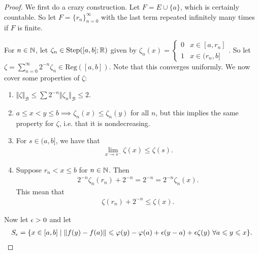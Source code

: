 \documentclass{report}
\begin{document}
\begin{proof}
    We first do a crazy construction. Let $F = E \cup \{a\}$, which is certainly countable. So let $F = \{r_n\}_{n=0}^\infty$ with the last term repeated infinitely many times if $F$ is finite.

    For $n \in \NN$, let $\zeta_n \in\mathrm{Step}([a,b]; \RR)$ given by $\zeta_n(x) = \begin{cases}
        0 & x \in [a, r_n] \\
        1 & x \in (r_n, b]
    \end{cases}$. So let $\zeta = \sum_{n=0}^\infty 2^{-n} \zeta_n \in \mathrm{Reg}([a,b])$.  Note that this converges uniformly. We now cover some properties of $\zeta$:
    \begin{enumerate}
        \item $\Vert \zeta \Vert_{\mathcal B} \leq \sum 2^{-n} \Vert \zeta_n\Vert_{\mathcal B} \leq 2$.
        \item $a \leq x < y \leq b \implies \zeta_n(x) \leq \zeta_n(y)$ for all $n$, but this implies the same property for $\zeta$, i.e. that it is nondecreasing.
        \item For $s \in (a, b]$, we have that 
        \begin{align*}
            \lim_{x \to s^-} \zeta(x) \leq \zeta(s).
        \end{align*}
        \item Suppose $r_n < x \leq b$ for $n \in \NN$. Then 
        \begin{align*}
            2^{-n}\zeta_n(r_n) + 2^{-n} = 2^{-n} = 2^{-n} \zeta_n(x).
        \end{align*}
        This mean that 
        \begin{align*}
            \zeta(r_n) + 2^{-n} \leq \zeta(x).
        \end{align*}
    \end{enumerate}
    Now let $\epsilon > 0$ and let
    \begin{align*}
        S_\epsilon = \{x \in [a,b] \mid \Vert f(y) - f (a) \Vert \leqslant \varphi(y) - \varphi(a) + \epsilon(y-a) + \epsilon \zeta(y) \,\, \forall a \leqslant y \leqslant x \}.
    \end{align*}

\end{proof}
\end{document}

